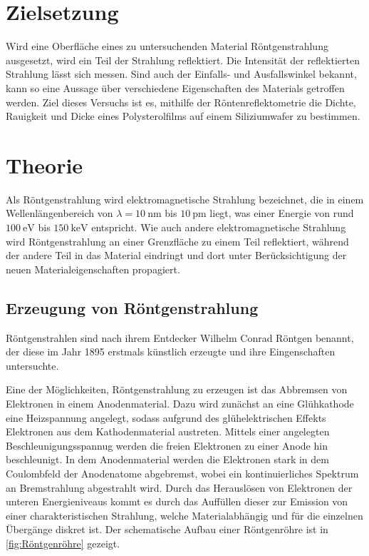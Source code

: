 \section{Zielsetzung}
\label{sec:Zielsetzung}
Wird eine Oberfläche eines zu untersuchenden Material Röntgenstrahlung ausgesetzt, wird ein Teil der Strahlung reflektiert. Die Intensität der reflektierten 
Strahlung lässt sich messen. Sind auch der Einfalls- und Ausfallswinkel bekannt, kann so eine Aussage über verschiedene Eigenschaften des Materials getroffen werden.
Ziel dieses Versuchs ist es, mithilfe der Röntenreflektometrie die Dichte, Rauigkeit und Dicke eines Polysterolfilms auf einem Siliziumwafer zu bestimmen.

\section{Theorie}
\label{sec:Theorie}
Als Röntgenstrahlung wird elektromagnetische Strahlung bezeichnet, die in einem Wellenlängenbereich von $\lambda = \qty{10}{\nano\metre}$ bis $\qty{10}{\pico\metre}$
liegt, was einer Energie von rund $\qty{100}{\eV}$ bis $\qty{150}{\kilo\eV}$ entspricht. Wie auch andere elektromagnetische Strahlung wird Röntgenstrahlung 
an einer Grenzfläche zu einem Teil reflektiert, während der andere Teil in das Material eindringt und dort unter Berücksichtigung der neuen Materialeigenschaften
propagiert.

\subsection{Erzeugung von Röntgenstrahlung}
Röntgenstrahlen sind nach ihrem Entdecker Wilhelm Conrad Röntgen benannt, der diese im Jahr 1895 erstmals künstlich erzeugte und ihre Eingenschaften untersuchte.

Eine der Möglichkeiten, Röntgenstrahlung zu erzeugen ist das Abbremsen von Elektronen in einem Anodenmaterial.
Dazu wird zunächst an eine Glühkathode eine Heizspannung angelegt, sodass aufgrund des glühelektrischen Effekts Elektronen aus dem Kathodenmaterial austreten.
Mittels einer angelegten Beschleunigungsspannug werden die freien Elektronen zu einer Anode hin beschleunigt. In dem Anodenmaterial werden die Elektronen stark in
dem Coulombfeld der Anodenatome abgebremst, wobei ein kontinuierliches Spektrum an Bremstrahlung abgestrahlt wird. 
Durch das Herauslösen von Elektronen der unteren Energieniveaus kommt es durch das Auffüllen dieser zur Emission von einer charakteristischen Strahlung, welche
Materialabhängig und für die einzelnen Übergänge diskret ist.
Der schematische Aufbau einer Röntgenröhre ist in \autoref{fig:Röntgenröhre} gezeigt.

